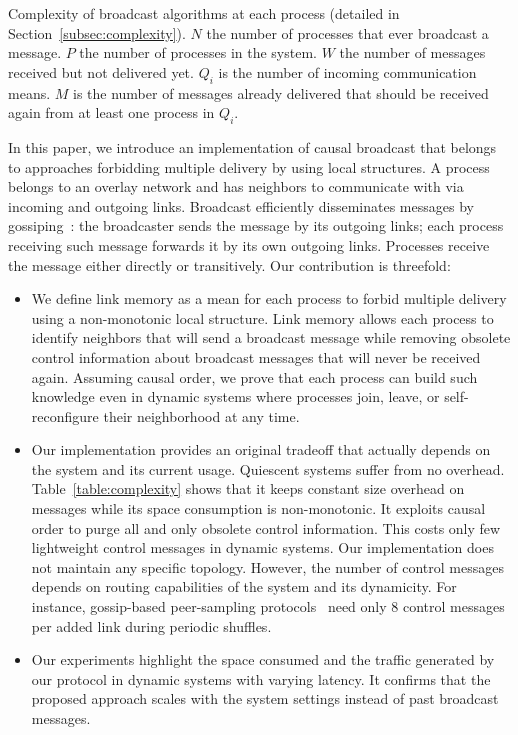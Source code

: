 \begin{table}
  \begin{center}
    \caption{\label{table:complexity} Complexity of broadcast algorithms at each
      process (detailed in Section~\ref{subsec:complexity}). $N$ the number of
      processes that ever broadcast a message. $P$ the number of processes in
      the system. $W$ the number of messages received but not delivered
      yet. $Q_i$ is the number of incoming communication means. $M$ is the number of
      messages already delivered that should be received again from at least one
      process in $Q_i$.}
  
  \end{center}
\end{table}

In this paper, we introduce an implementation of causal broadcast that belongs
to approaches forbidding multiple delivery by using local structures. A process
belongs to an overlay network and has neighbors to communicate with via incoming
and outgoing links.  Broadcast efficiently disseminates messages by
gossiping~\cite{jelasity2007gossip}: the broadcaster sends the message by its
outgoing links; each process receiving such message forwards it by its own
outgoing links. Processes receive the message either directly or
transitively. Our contribution is threefold:
\begin{itemize}[leftmargin=*]
\item We define link memory as a mean for each process to forbid multiple
  delivery using a non-monotonic local structure. Link memory allows each
  process to identify neighbors that will send a broadcast message while
  removing obsolete control information about broadcast messages that will never
  be received again. Assuming causal order, we prove that each process can build
  such knowledge even in dynamic systems where processes join, leave, or
  self-reconfigure their neighborhood at any time.
\item Our implementation provides an original tradeoff that actually depends on
  the system and its current usage. Quiescent systems suffer from no
  overhead. Table~\ref{table:complexity} shows that it keeps constant size
  overhead on messages while its space consumption is non-monotonic. It exploits
  causal order to purge all and only obsolete control information. This costs
  only few lightweight control messages in dynamic systems.  Our implementation
  does not maintain any specific topology. However, the number of control
  messages depends on routing capabilities of the system and its dynamicity. For
  instance, gossip-based peer-sampling
  protocols~\cite{jelasity2007gossip,jelasity2009tman,nedelec2017adaptive} need
  only 8 control messages per added link during periodic shuffles.
\item Our experiments highlight the space consumed and the traffic generated by
  our protocol in dynamic systems with varying latency. It confirms that the
  proposed approach scales with the system settings instead of past broadcast
  messages.
\end{itemize}
